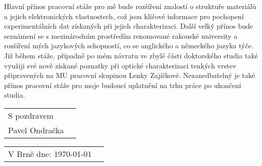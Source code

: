 \documentclass[12pt,a4paper,oneside,final]{article}
\begin{document}
Hlavní přínos pracovní stáže pro mě bude rozšíření znalostí o struktuře materiálů a jejich elektronických vlastnostech, což jsou klíčové informace pro pochopení experimentálních dat získaných při jejich charakterizaci. Další velký přínos bude seznámení se s mezinárodním prostředím renomované rakouské university a rozšíření mých jazykových schopností, co se anglického a německého jazyka týče. Již během stáže, případně po mém návratu ve zbylé části doktorského studia také využiji své nově získané poznatky při optické charakterizaci tenkých vrstev připravených na MU pracovní skupinou Lenky Zajíčkové. Nezanedbatelný je také přínos pracovní stáže pro moje budoucí uplatnění na trhu práce po ukončení studia.
\newline
\begin{flushright}
\begin{tabular}{ll}
S pozdravem \\
Pavel Ondračka
\end{tabular}
\end{flushright}
\vspace{0,3cm}
\begin{tabular}{ll}
V Brně dne: \today \hspace{5cm} 
\end{tabular}
\end{document}
